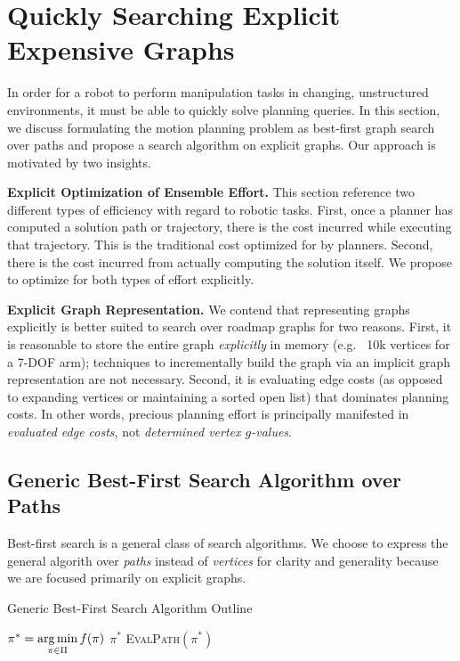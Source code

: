 \section{Quickly Searching Explicit Expensive Graphs}
\label{chap:e8}

In order for a robot to perform manipulation tasks
in changing, unstructured environments,
it must be able to quickly solve planning queries.
In this section,
we discuss formulating
the motion planning problem as best-first graph search over paths
and propose a search algorithm on explicit graphs.
Our approach is motivated by two insights.

\textbf{Explicit Optimization of Ensemble Effort.}
This section reference two different types of efficiency
with regard to robotic tasks.
First, once a planner has computed a solution path or trajectory,
there is the cost incurred while executing that trajectory.
This is the traditional cost optimized for by planners.
Second, there is the cost incurred from actually computing the solution
itself.
We propose to optimize for both types of effort explicitly.

\textbf{Explicit Graph Representation.}
We contend that representing graphs explicitly
is better suited to search over roadmap graphs
for two reasons.
First, it is reasonable to store the entire graph
\emph{explicitly} in memory
(e.g. ~10k vertices for a 7-DOF arm);
techniques to incrementally build the graph
via an implicit graph representation
are not necessary.
Second,
it is evaluating edge costs
(as opposed to expanding vertices or maintaining
a sorted open list)
that dominates planning costs.
In other words,
precious planning effort is principally manifested in
\emph{evaluated edge costs},
not \emph{determined vertex $g$-values}.

\subsection{Generic Best-First Search Algorithm over Paths}

Best-first search\cite{winston1977ai}
is a general class of search algorithms.
We choose to express the general algorith
over \emph{paths} instead of \emph{vertices}
for clarity and generality
because we are focused primarily on explicit graphs.
\begin{algorithm}
   \caption{Generic Best-First Search Algorithm Outline}
   \label{alg:generic-best-first}
   \begin{algorithmic}[1]
   \Loop
      \State $\pi^* = \operatorname*{arg\,min}\limits_{\pi \in \Pi} f(\pi)$
         \label{line:generic-select-optimistic-path}
         \State \Return $\pi^*$
      \EndIf
      \State \textsc{EvalPath}$(\pi^*)$
   \EndLoop
   \EndProcedure
   \end{algorithmic}
\end{algorithm}

